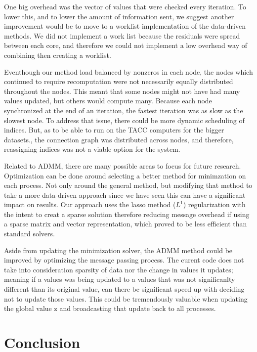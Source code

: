 \documentclass[letterpaper,11pt,onecolumn]{article}
\begin{document}
One big overhead was the vector of values that were checked every iteration. To lower this, and to lower the amount of information sent, we suggest another improvement would be to move to a worklist implementation of the data-driven methods. We did not implement a work list because the residuals were spread between each core, and therefore we could not implement a low overhead way of combining then creating a worklist. 

Eventhough our method load balanced by nonzeros in each node, the nodes which continued to require recomputation were not necessarily equally distributed throughout the nodes. This meant that some nodes might not have had many values updated, but others would compute many. Because each node synchronized at the end of an iteration, the fastest iteration was as slow as the slowest node. To address that issue, there could be more dynamic scheduling of indices. But, as to be able to run on the TACC computers for the bigger datasets., the connection graph was distributed across nodes, and therefore, reassigning indices was not a viable option for the system.

Related to ADMM, there are many possible areas to focus for future research. Optimization can be done around selecting a better method for minimzation on each process. Not only around the general method, but modifying that method to take a more data-driven approach since we have seen this can have a significant impact on results. Our approach uses the lasso method ($L^{1}$) regularization with the intent to creat a sparse solution therefore reducing message overhead if using a sparse matrix and vector representation, which proved to be less efficient than standard solvers. 

Aside from updating the minimization solver, the ADMM method could be improved by optimizing the message passing process. The curent code does not take into consideration sparsity of data nor the change in values it updates; meaning if a values was being updated to a values that was not significanlty different than its original value, can there be significant speed up with deciding not to update those values. This could be tremendously valuable when updating the global value z and broadcasting that update back to all processes.

\section{Conclusion}
\end{document}

